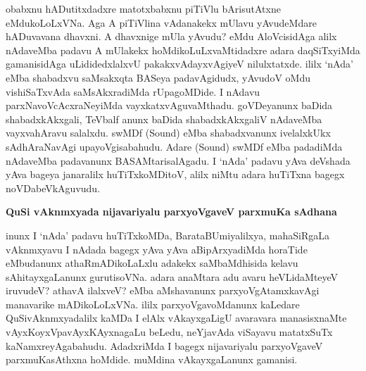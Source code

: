 obabxnu hADutitxdadxre matotxbabxnu piTiVlu bArisu\-tAtxne eMdukoLoLxVNa. Aga A piTiVlina vAdanakekx mUlavu yAvudeMdare hADuvavana dhavxni. A dhavxnige mUla yAvudu? eMdu AloVcisidAga alilx nAdaveMba padavu A mUlakekx hoMdikoLuLxvaMti\-dadxre adara daqSiTxyiMda gamanisidAga uLididedxlalxvU pakakxvAdayxvAgiyeV nilulxtatxde. ililx `nAda' eMba shabadxvu saMsakxqta BASeya padavAgidudx, yAvudoV oMdu vishiSaTxvAda saMsAkxradiMda rUpagoMDide. I nAdavu parxNavoVcAcxraNeyiMda vayxkatxvAguvaMthadu. goVDeyanunx baDida shabadxkAkxgali, TeVbalf anunx baDida shabadxkAkxgaliV nAdaveMba vayxvahAravu salalxdu. swMDf {\rm (Sound)} eMba shabadxvanunx ivelalxkUkx sAdhA\-raNavAgi upayoVgisabahudu. Adare {\rm (Sound)} swMDf eMba padadiMda nAdaveMba pada\-vanunx BASAMtarisalAgadu. I `nAda' padavu yAva deVshada yAva bageya janaralilx huTiTxkoMDitoV, alilx niMtu adara huTiTxna bagegx noVDabeVkAguvudu.

{\bigskip
\noindent
{\large\bf QuSi vAknmxyada nijavariyalu parxyoVgaveV parxmuKa sAdhana}}\label{page143}
\medskip

\noindent
inunx I `nAda' padavu huTiTxkoMDa, BarataBUmiyalilxya, mahaSiRgaLa vAknmxyavu I nAdada bagegx yAva yAva aBipArxyadiMda horaTide eMbudanunx athaRmADikoLaLxlu adakekx saMbaMdhisida kelavu sAhitayxgaLanunx gurutisoVNa. adara anaMtara adu avaru heVLidaMteyeV iruvudeV? athavA ilalxveV? eMba aMshavanunx parxyoVgAtamxkavAgi manavarike mADikoLoLxVNa. ililx parxyoVgavoMdanunx kaLedare QuSivAknmxyadalilx kaMDa I elAlx vAkayxgaLigU avaravara manasisxnaMte vAyxKoyxVpavAyxKAyxnagaLu beLedu, neYjavAda viSayavu matatxSuTx kaNamxreyAgabahudu. AdadxriMda I bagegx nijavariyalu parxyoV\-gaveV parxmuKasAthxna hoMdide. muMdina vAkayxgaLanunx gamanisi.

